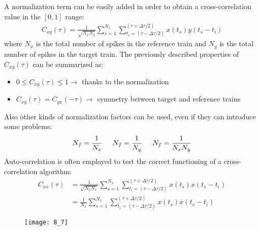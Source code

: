 A normalization term can be easily added in order to obtain
a cross-correlation value in the \([0, 1]\) range:
\begin{align*}
    C_{xy}(\tau)
    =\frac{1}{\sqrt{N_xN_y}}\sum_{s=1}^{N_x}\sum_{t_{i}=(\tau-\Delta{\tau}/2)}^{(\tau+\Delta{\tau}/2)}x(t_s)y(t_s-t_i)
\end{align*}
where \(N_x\) is the total number of spikes in the reference train and \(N_y\) is the
total number of spikes in the target train. The previously described properties of
\(C_{xy}(\tau)\) can be summarized as:
\begin{itemize}
    \item \(0\le{C_{xy}(\tau)}\le{1}\rightarrow\) thanks to the normalization
    \item \(C_{xy}(\tau)=C_{yx}(-\tau)\rightarrow\) symmetry between target and reference trains
\end{itemize}
Also other kinds of normalization factors can be used, even if they can introduce some problems:
\begin{equation*}
    N_f = \frac{1}{N_x} \hspace{0.5cm} N_f=\frac{1}{N_y} \hspace{0.5cm} N_f=\frac{1}{N_xN_y}
\end{equation*}
Auto-correlation is often employed to test the correct functioning of a cross-correlation
algorithm:
\begin{align*}
    C_{xx}(\tau)
     & =\frac{1}{\sqrt{N_xN_x}}\sum_{s=1}^{N_x}\sum_{t_{i}=(\tau-\Delta{\tau}/2)}^{(\tau+\Delta{\tau}/2)}x(t_s)x(t_s-t_i) \\
     & =\frac{1}{N_x}\sum_{s=1}^{N_x}\sum_{t_{i}=(\tau-\Delta{\tau}/2)}^{(\tau+\Delta{\tau}/2)}x(t_s)x(t_s-t_i)
\end{align*}
\begin{figure}[H]
    \texttt{[image: 8\_7]}
    \centering
\end{figure}
